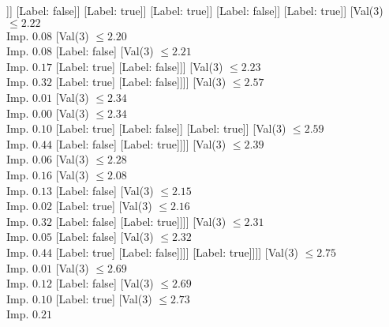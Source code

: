 \documentclass[margin=10pt]{standalone}
\begin{document}
\begin{forest}
															[Val($3$) $ \leq 2.05$ \\ Imp. $0.00$
																[Label: true]
																[Val($3$) $ \leq 2.06$ \\ Imp. $0.07$
																	[Label: false]
																	[Label: true]]]
															[Label: false]]
														[Label: true]]
													[Label: true]]
												[Label: false]]
											[Label: true]]
										[Val($3$) $ \leq 2.22$ \\ Imp. $0.08$
											[Val($3$) $ \leq 2.20$ \\ Imp. $0.08$
												[Label: false]
												[Val($3$) $ \leq 2.21$ \\ Imp. $0.17$
													[Label: true]
													[Label: false]]]
											[Val($3$) $ \leq 2.23$ \\ Imp. $0.32$
												[Label: true]
												[Label: false]]]]
									[Val($3$) $ \leq 2.57$ \\ Imp. $0.01$
										[Val($3$) $ \leq 2.34$ \\ Imp. $0.00$
											[Val($3$) $ \leq 2.34$ \\ Imp. $0.10$
												[Label: true]
												[Label: false]]
											[Label: true]]
										[Val($3$) $ \leq 2.59$ \\ Imp. $0.44$
											[Label: false]
											[Label: true]]]]
								[Val($3$) $ \leq 2.39$ \\ Imp. $0.06$
									[Val($3$) $ \leq 2.28$ \\ Imp. $0.16$
										[Val($3$) $ \leq 2.08$ \\ Imp. $0.13$
											[Label: false]
											[Val($3$) $ \leq 2.15$ \\ Imp. $0.02$
												[Label: true]
												[Val($3$) $ \leq 2.16$ \\ Imp. $0.32$
													[Label: false]
													[Label: true]]]]
										[Val($3$) $ \leq 2.31$ \\ Imp. $0.05$
											[Label: false]
											[Val($3$) $ \leq 2.32$ \\ Imp. $0.44$
												[Label: true]
												[Label: false]]]]
									[Label: true]]]]
						[Val($3$) $ \leq 2.75$ \\ Imp. $0.01$
							[Val($3$) $ \leq 2.69$ \\ Imp. $0.12$
								[Label: false]
								[Val($3$) $ \leq 2.69$ \\ Imp. $0.10$
									[Label: true]
									[Val($3$) $ \leq 2.73$ \\ Imp. $0.21$

\end{forest}
\end{document}
